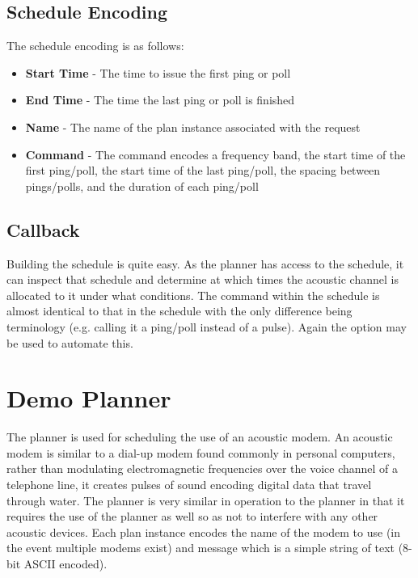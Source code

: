 \subsection{Schedule Encoding}
The schedule encoding is as follows:
\begin{itemize}
\item \textbf{Start Time} - The time to issue the first ping or poll
\item \textbf{End Time} - The time the last ping or poll is finished
\item \textbf{Name} - The name of the plan instance associated with the  request
\item \textbf{Command} - The command encodes a frequency band, the start time of the first ping/poll, the start time of the last ping/poll, the spacing between pings/polls, and the duration of each ping/poll
\end{itemize}

\subsection{Callback }
Building the schedule is quite easy. As the  planner has access to the  schedule, it can inspect that schedule and determine at which times the acoustic channel is allocated to it under what conditions. The command within the  schedule is almost identical to that in the  schedule with the only difference being terminology (e.g. calling it a ping/poll instead of a pulse). Again the  option may be used to automate this.

\section{Demo  Planner}
The  planner is used for scheduling the use of an acoustic modem. An acoustic modem is similar to a dial-up modem found commonly in personal computers, rather than modulating electromagnetic frequencies over the voice channel of a telephone line, it creates pulses of sound encoding digital data that travel through water. The  planner is very similar in operation to the  planner in that it requires the use of the  planner as well so as not to interfere with any other acoustic devices. Each  plan instance encodes the name of the modem to use (in the event multiple modems exist) and  message which is a simple string of text (8-bit ASCII encoded).

